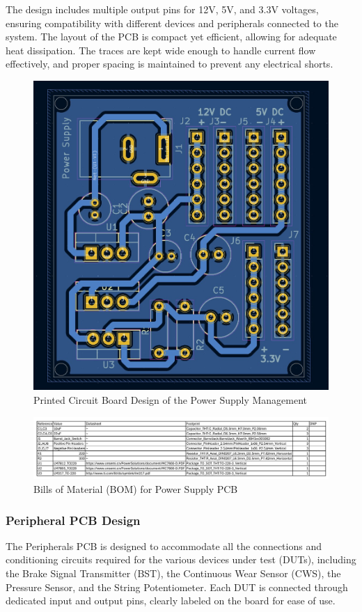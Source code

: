 \documentclass[12pt]{article}
\begin{document}
The design includes multiple output pins for 12V, 5V, and 3.3V voltages,
ensuring compatibility with different devices and peripherals connected to the
system. The layout of the PCB is compact yet efficient, allowing for adequate
heat dissipation. The traces are kept wide enough to handle current flow
effectively, and proper spacing is maintained to prevent any electrical shorts.

\begin{figure}[H]
  \includegraphics[width=\textwidth]{../assets/pcb/image6.jpg}
  \caption{Printed Circuit Board Design of the Power Supply Management}
\end{figure}

\begin{figure}[H]
  \includegraphics[width=\textwidth]{../assets/pcb/image7.jpg}
  \caption{Bills of Material (BOM) for Power Supply PCB}
\end{figure}
\subsubsection*{Peripheral PCB Design}
The Peripherals PCB is designed to accommodate all the connections and
conditioning circuits required for the various devices under test (DUTs),
including the Brake Signal Transmitter (BST), the Continuous Wear Sensor (CWS),
the Pressure Sensor, and the String Potentiometer. Each DUT is connected
through dedicated input and output pins, clearly labeled on the board for ease
of use.
\end{document}
